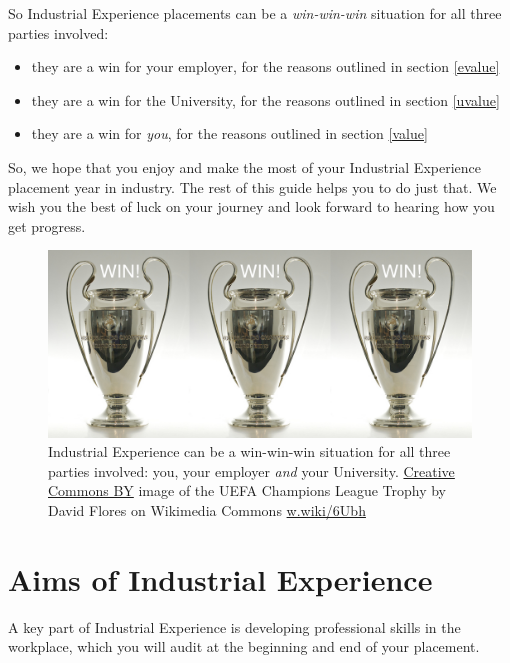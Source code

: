 \documentclass[
]{book}
\providecommand{\tightlist}{%
  \setlength{\itemsep}{0pt}\setlength{\parskip}{0pt}}
\begin{document}
So Industrial Experience placements can be a \emph{win-win-win} situation for all three parties involved:

\begin{itemize}
\tightlist
\item
  they are a win for your employer, for the reasons outlined in section \ref{evalue}
\item
  they are a win for the University, for the reasons outlined in section \ref{uvalue}
\item
  they are a win for \emph{you}, for the reasons outlined in section \ref{value}
\end{itemize}

So, we hope that you enjoy and make the most of your Industrial Experience placement year in industry. The rest of this guide helps you to do just that. We wish you the best of luck on your journey and look forward to hearing how you get progress.

\begin{figure}

{\centering \includegraphics[width=1\linewidth]{images/winwinwin} 

}

\caption{Industrial Experience can be a win-win-win situation for all three parties involved: you, your employer \emph{and} your University. \href{https://creativecommons.org/licenses/by/2.0/deed.en}{Creative Commons BY} image of the UEFA Champions League Trophy by David Flores on Wikimedia Commons \href{https://w.wiki/6Ubh}{w.wiki/6Ubh}}\label{fig:winwinwin-fig}
\end{figure}



\chapter{Aims of Industrial Experience}\label{aims}

A key part of Industrial Experience is developing professional skills in the workplace, which you will audit at the beginning and end of your placement.
\end{document}
